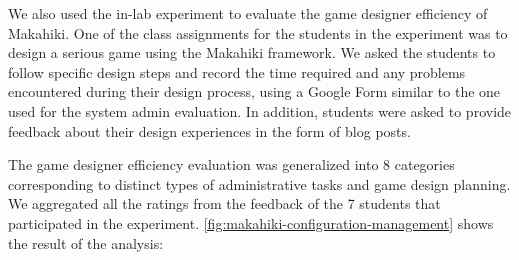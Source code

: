\documentclass{sigchi}
\begin{document}
We also used the in-lab experiment to evaluate the game
designer efficiency of Makahiki. One of the class assignments for the students in the
experiment was to design a serious game using the Makahiki framework. We asked the students
to follow specific design steps and record the time required and any problems encountered during
their design process, using a Google Form similar to the one used for the system admin
evaluation. In addition, students were asked to provide feedback about their
design experiences in the form of blog posts.

The game designer efficiency evaluation was generalized into 8 categories corresponding to 
distinct types of administrative tasks and game design planning. We aggregated all the 
ratings from the feedback of the 7 students that participated in the experiment. 
\autoref{fig:makahiki-configuration-management} shows the result of the analysis:
\end{document}
